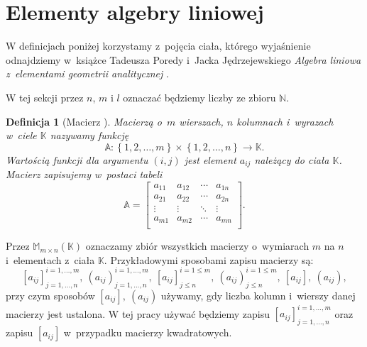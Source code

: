 \documentclass[12pt,a4paper]{report}
\newtheorem{df}{Definicja}[chapter]
\newcommand{\set}[1]{\left\lbrace {#1} \right\rbrace}
\newcommand{\setK}{\mathbb{K}}
\newcommand{\setN}{\mathbb{N}}
\begin{document}
\section{Elementy algebry liniowej}

W definicjach poniżej korzystamy z~pojęcia ciała, którego wyjaśnienie odnajdziemy w~książce Tadeusza Poredy i~Jacka Jędrzejewskiego \textit{Algebra liniowa z~elementami geometrii analitycznej} {\citep[Sec 4.4]{alzega}}.
\bigskip

W tej sekcji przez $n$, $m$ i $l$ oznaczać będziemy liczby ze zbioru $\setN$. 
\begin{df}[Macierz {\citep[Sec 8.1 Def. 8.1]{alzega}}]
Macierzą o~$m$ wierszach, $n$ kolumnach i~wyrazach w~ciele $\setK$ nazywamy funkcję 
$$
\mathbb{A}: \set{1,2, \ldots ,m}\times \set{1,2, \ldots ,n} \to \setK.
$$
Wartością funkcji dla argumentu $(i,j)$ jest element $a_{ij}$  należący do ciała $\setK$. Macierz zapisujemy w~postaci tabeli
$$
\mathbb{A} = \left[
        \begin{array}{cccc}
         a_{11} & a_{12} & \cdots & a_{1n} \\
         a_{21} & a_{22} & \cdots & a_{2n} \\
         \vdots & \vdots & \ddots & \vdots \\
         a_{m1} & a_{m2} & \cdots & a_{mn} \\
         \end{array}
      \right].
$$
\end{df}
\bigskip
Przez $\mathbb{M}_{m \times n}(\setK)$ oznaczamy zbiór wszystkich macierzy o~wymiarach $m$ na $n$ i~elementach z~ciała $\setK$. Przykładowymi sposobami zapisu macierzy są:
$$
[a_{ij}]_{j = 1, \ldots, n}^{i = 1, \ldots , m}, \: (a_{ij})_{j = 1, \ldots, n}^{i = 1, \ldots , m}, \: [a_{ij}]_{j \leq n}^{i = 1 \leq m}, \: (a_{ij})_{j \leq n}^{i = 1 \leq m}, \: [a_{ij}], \: (a_{ij}),
$$
przy czym sposobów $[a_{ij}], \: (a_{ij})$ używamy, gdy liczba kolumn i~wierszy danej macierzy jest ustalona. 
W tej pracy używać będziemy zapisu $[a_{ij}]_{j = 1, \ldots, n}^{i = 1, \ldots , m}$ oraz zapisu $[a_{ij}]$ w~przypadku macierzy kwadratowych.
\end{document}

